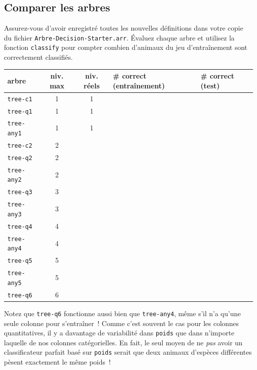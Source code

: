 \documentclass[12pt,a4paper]{article}
\begin{document}
\subsection{Comparer les arbres}

\begin{activitybox}
  Assurez-vous d'avoir enregistré toutes les nouvelles définitions dans votre copie du fichier \texttt{Arbre-Decision-Starter.arr}. Évaluez chaque arbre et utilisez la fonction \texttt{classify} pour compter combien d'animaux du jeu d'entraînement sont correctement classifiés.

  \begin{center}
  \begin{tabularx}{\textwidth}{l c c X X}
    \toprule
    \textbf{arbre} & \textbf{niv. max} & \textbf{niv. réels} & \textbf{\# correct (entraînement)} & \textbf{\# correct (test)} \\
    \midrule
    \texttt{tree-c1}   & 1 & 1 & & \\
    \texttt{tree-q1}   & 1 & 1 & & \\
    \texttt{tree-any1} & 1 & 1 & & \\
    \texttt{tree-c2}   & 2 &   & & \\
    \texttt{tree-q2}   & 2 &   & & \\
    \texttt{tree-any2} & 2 &   & & \\
    \texttt{tree-q3}   & 3 &   & & \\
    \texttt{tree-any3} & 3 &   & & \\
    \texttt{tree-q4}   & 4 &   & & \\
    \texttt{tree-any4} & 4 &   & & \\
    \texttt{tree-q5}   & 5 &   & & \\
    \texttt{tree-any5} & 5 &   & & \\
    \texttt{tree-q6}   & 6 &   & & \\
    \bottomrule
  \end{tabularx}
  \end{center}

  Notez que \texttt{tree-q6} fonctionne aussi bien que \texttt{tree-any4}, même s'il n'a qu'une seule colonne pour s'entraîner~! Comme c'est souvent le cas pour les colonnes quantitatives, il y a davantage de variabilité dans \texttt{poids} que dans n'importe laquelle de nos colonnes catégorielles. En fait, le seul moyen de ne \emph{pas} avoir un classificateur parfait basé sur \texttt{poids} serait que deux animaux d'espèces différentes pèsent exactement le même poids~!
\end{activitybox}
\end{document}
